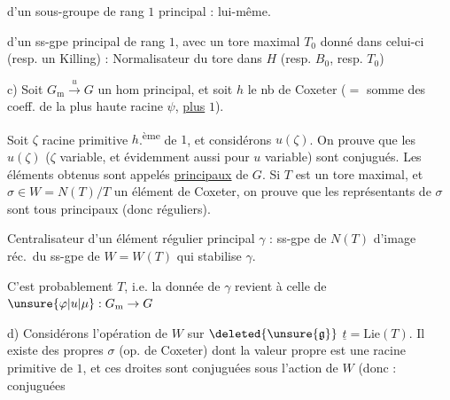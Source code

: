  d'un sous-groupe  de rang $1$ principal : lui-même.

 d'un ss-gpe principal de rang $1$, avec un tore maximal $T_0$ donné dans celui-ci (resp. un  Killing) : Normalisateur du tore dans $H$ (resp. $B_0$, resp. $T_0$)


c) Soit $G_{\mathrm m}\xrightarrow{u}G$ un hom principal, et soit  $h$  le nb de Coxeter ($=$ somme des coeff. de la plus haute racine $\psi$, \uline{plus} $1$).

Soit $\zeta$  racine primitive $h$.\textsuperscript{ème} de $1$, et considérons $u(\zeta)$. On prouve que les $u(\zeta)$ ($\zeta$ variable, et évidemment aussi pour $u$ variable) sont conjugués. Les éléments obtenus sont appelés  \uline{principaux}  de $G$. Si $T$ est un tore maximal, et $\sigma\in W=N(T)/T$  un  élément de Coxeter, on prouve que les représentants de $\sigma$ sont tous principaux (donc réguliers).


Centralisateur d'un élément régulier principal $\gamma$ : ss-gpe de $N(T)$  d'image réc.\ du ss-gpe de $W=W(T)$ qui stabilise $\gamma$.

 C'est probablement $T$, i.e.  la donnée de $\gamma$ revient à celle de $\unsure{\varphi|u|\mu}:G_{\mathrm m}\to G$

d) Considérons l'opération de $W$ sur $\deleted{\unsure{\mathfrak g}}$ $\underline t=\mathrm{Lie}(T)$. Il existe des  propres  $\sigma$ (op. de Coxeter) dont la valeur propre est une racine primitive de $1$,  et ces droites sont conjuguées sous l'action de $W$ (donc :  conjuguées

